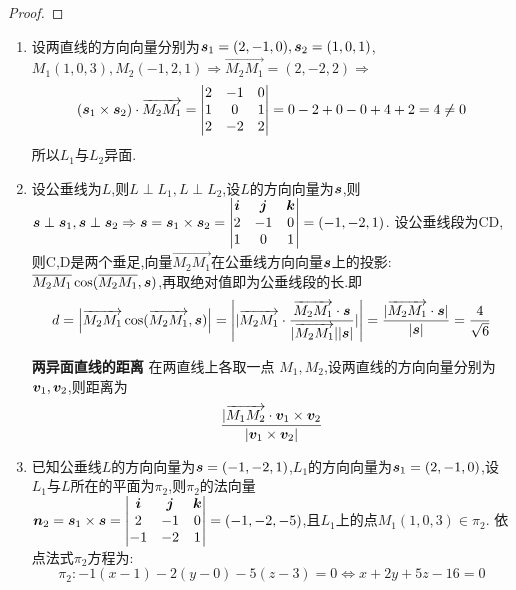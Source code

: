 \begin{proof}
    
\end{proof}

\begin{solution}
    \begin{enumerate}
        \item 设两直线的方向向量分别为$\bm{s}_1 = (2,-1,0),\bm{s}_2 = (1,0,1)$,$M_1(1,0,3),M_2(-1,2,1) \Rightarrow \overrightarrow{M_2 M_1} = (2,-2,2) \Rightarrow$
    $$
    (\bm{s}_1 \times \bm{s}_2) \cdot \overrightarrow{M_2 M_1} = \begin{vmatrix}
        2 & -1 & 0 \\
        1 & 0 & 1 \\
        2 & -2 & 2
    \end{vmatrix} = 0-2+0-0+4+2 = 4 \neq 0
    $$
    所以$L_1$与$L_2$异面.
    \item 设公垂线为$L$,则$L \perp L_1,L \perp L_2$,设$L$的方向向量为$\bm{s}$,则$\bm{s} \perp \bm{s}_1,\bm{s} \perp \bm{s}_2 \Rightarrow \bm{s} = \bm{s}_1 \times \bm{s}_2 = \begin{vmatrix}
        \bm{i} & \bm{j} & \bm{k} \\
        2 & -1 & 0 \\
        1 & 0 & 1
    \end{vmatrix} = (-1,-2,1)$.
    设公垂线段为CD,则C,D是两个垂足,向量$\overrightarrow{M_2 M_1}$在公垂线方向向量$\bm{s}$上的投影:$\overline{M_2 M_1} \cos(\overline{M_2 M_1},\bm{s}) $,再取绝对值即为公垂线段的长.即
    $$
    d = \left| \overrightarrow{M_2 M_1} \cos (\overrightarrow{M_2 M_1},\bm{s}) \right| = \left| |\overrightarrow{M_2 M_1} \cdot \frac{\overrightarrow{M_2 M_1} \cdot \bm{s}}{|\overrightarrow{M_2 M_1}| |\bm{s}|} | \right| = \frac{|\overrightarrow{M_2 M_1} \cdot \bm{s}|}{|\bm{s}|} = \frac{4}{\sqrt{6}}
    $$

    \begin{remark}
        \textbf{两异面直线的距离}  在两直线上各取一点 $M_1, M_2$,设两直线的方向向量分别为$\bm{v}_1,\bm{v}_2$,则距离为
        $$
        \frac{| \overrightarrow{M_1 M_2} \cdot \bm{v}_1 \times \bm{v}_2 }{|\bm{v}_1 \times \bm{v}_2|}
        $$
    \end{remark}

    \item 已知公垂线$L$的方向向量为$\bm{s} = (-1,-2,1)$,$L_1$的方向向量为$\bm{s}_1 = (2,-1,0)$,设$L_1$与$L$所在的平面为$\pi_2$,则$\pi_2$的法向量$\bm{n}_2 = \bm{s}_1 \times \bm{s} = \begin{vmatrix}
        \bm{i} & \bm{j} & \bm{k} \\
        2 & -1 & 0 \\
        -1 & -2 & 1
    \end{vmatrix} = (-1,-2,-5)$,且$L_1$上的点$M_1(1,0,3) \in \pi_2$.
    依点法式$\pi_2$方程为:
    $$
    \pi_2: -1(x-1)-2(y-0)-5(z-3) = 0 \Leftrightarrow x+2y+5z-16 = 0
    $$


\end{enumerate}
\end{solution}
